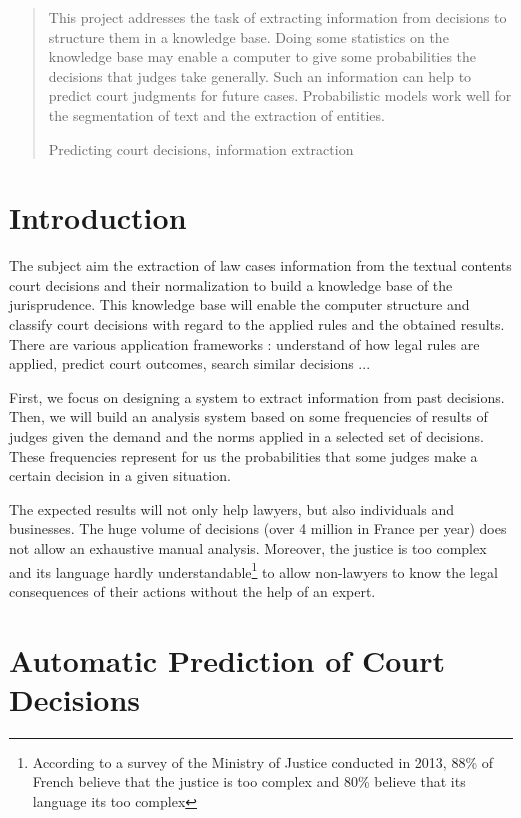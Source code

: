 \documentclass[runningheads,a4paper]{llncs}
\newcommand{\keywords}[1]{\par\addvspace\baselineskip
\noindent\keywordname\enspace\ignorespaces#1}
\begin{document}
\begin{abstract}

This project addresses the task of extracting information from decisions to structure them in a knowledge base. Doing some statistics on the knowledge base may enable a computer to give some probabilities the decisions that judges take generally. Such an information can help to predict court judgments for future cases. Probabilistic models work well for the segmentation of text and the extraction of entities. 

\keywords{Predicting court decisions, information extraction}
\end{abstract}


\section{Introduction}

The subject aim the extraction of law cases information from the textual contents court decisions and their normalization to build a knowledge base of the jurisprudence. This knowledge base will enable the computer structure and classify court decisions with regard to the applied rules and the obtained results. There are various application frameworks : understand of how legal rules are applied, predict court outcomes, search similar decisions ... 

First, we focus on designing a system to extract information from past decisions. Then, we will build an analysis  system based on some frequencies of results of judges given the demand and the norms applied in a selected  set of decisions. These frequencies represent for us the probabilities that some judges make a certain decision in a given situation.

The expected results will not only help lawyers, but also individuals and businesses. The huge volume of decisions (over 4 million in France per year) does not allow an exhaustive manual analysis. Moreover, the justice is too complex and its language hardly understandable\footnote{According to a survey of the Ministry of Justice conducted in 2013, 88\% of French believe that the justice is too complex and 80\% believe that its language its too complex\cite{cretin2014justicecomplexe}} to allow non-lawyers to know the legal consequences of their actions without the help of an expert.

\section{Automatic Prediction of Court Decisions}
\end{document}
